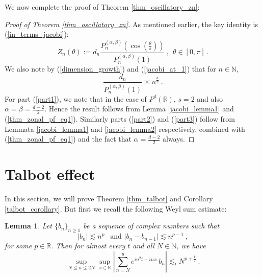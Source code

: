 \documentclass[12pt]{amsart}
\newtheorem{lemma}[theorem]{Lemma}
\theoremstyle{definition}
\newcommand{\R}{\mathbb R}%
\newcommand{\N}{\mathbb N}%
\numberwithin{equation}{section}
\begin{document}
We now complete the proof of Theorem \ref{thm_oscillatory_zn}:
\begin{proof}[Proof of Theorem \ref{thm_oscillatory_zn}]
As mentioned earlier, the key identity is (\ref{in_terms_jacobi}):
\begin{equation*} 
Z_n(\theta):= d_n \frac{P^{(\alpha,\beta)}_n{\left(\cos\left(\frac{\theta}{s}\right)\right)}}{P^{(\alpha,\beta)}_n(1)}\:,\:\:\theta \in [0,\pi]\:.
\end{equation*}
We also note by (\ref{dimension_growth}) and (\ref{jacobi_at_1}) that for $n \in \N$,
\begin{equation} \label{thm_zonal_pf_eq1}
\frac{d_n}{P^{(\alpha,\beta)}_n(1)} \asymp n^{\frac{d}{2}}\:. 
\end{equation} 
For part (\ref{part1}), we note that in the case of $P^d(\R)$, $s=2$ and also $\alpha=\beta=\frac{d-2}{2}$. Hence the result follows from Lemma \ref{jacobi_lemma1} and (\ref{thm_zonal_pf_eq1}). Similarly parts (\ref{part2}) and (\ref{part3}) follow from Lemmata \ref{jacobi_lemma1} and \ref{jacobi_lemma2} respectively, combined with (\ref{thm_zonal_pf_eq1}) and the fact that $\alpha=\frac{d-2}{2}$ always.
\end{proof}




\section{Talbot effect} \label{sec7}
In this section, we will prove Theorem \ref{thm_talbot} and Corollary \ref{talbot_corollary}. But first we recall the following Weyl sum estimate:
\begin{lemma}\cite[Lemma 3.2]{MathZ}  \label{Weyl_estimate}
Let $\{b_n\}_{n \ge 1}$ be a sequence of complex numbers such that
\begin{equation*}
|b_n| \lesssim n^p\:\:\text{ and } |b_n-b_{n-1}| \lesssim n^{p-1}\:,
\end{equation*}
for some $p \in \R$. Then for almost every $t$ and all $N \in \N$, we have
\begin{equation*}
\sup_{N \le u \le 2N} \sup_{x \in \R} \left|\sum_{n=N}^u e^{in^2t+inx}\: b_n\right|\lesssim_t N^{p+\frac{1}{2}}\:.
\end{equation*}
\end{lemma}
\end{document}
